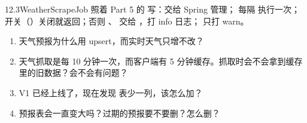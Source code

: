 \begin{task}{12.3\quad WeatherScrapeJob}
照着 Part 5 的  写：交给 Spring 管理； 每隔  执行一次；开关（）关闭就返回；否则 、 交给 ，打 info 日志； 只打 warn。
\end{task}

\begin{think}
\begin{enumerate}
  \item 天气预报为什么用 upsert，而实时天气只增不改？
  \item 天气抓取是每 10 分钟一次，而客户端有 5 分钟缓存。抓取时会不会拿到缓存里的旧数据？会不会有问题？
  \item V1 已经上线了，现在发现  表少一列，该怎么加？
  \item 预报表会一直变大吗？过期的预报要不要删？怎么删？
\end{enumerate}
\end{think}
